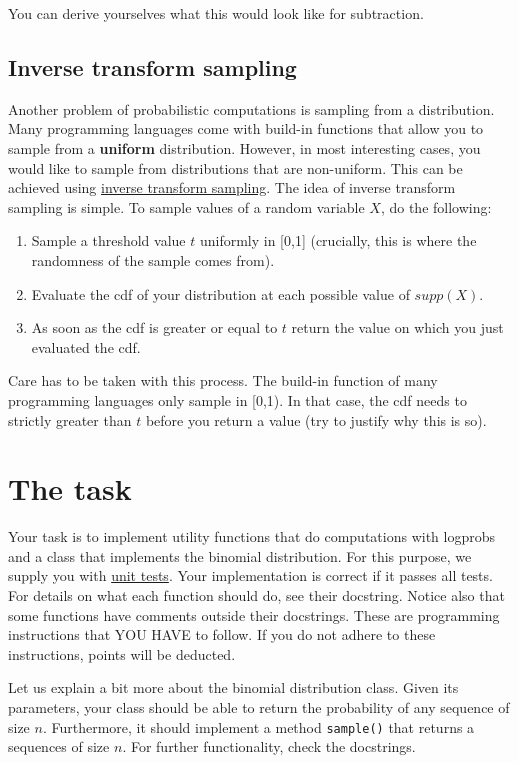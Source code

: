 \documentclass[11pt, leqno, a4paper]{article}
\begin{document}
You can derive yourselves what this would look like for subtraction.

\subsection{Inverse transform sampling}
Another problem of probabilistic computations is sampling from a distribution. Many programming languages
come with build-in functions that allow you to sample from a \textbf{uniform} distribution. However,
in most interesting cases, you would like to sample from distributions that are non-uniform. This can
be achieved using 
\href{https://en.wikipedia.org/wiki/Inverse_transform_sampling}{inverse transform sampling}. The idea of 
inverse transform sampling is simple. To sample values of a random variable $ X $, do the following:
\begin{enumerate}
\item Sample a threshold value $ t $ uniformly in [0,1] (crucially, this is where the randomness of the 
sample comes from).
\item Evaluate the cdf of your distribution at each possible value of $ supp(X) $.
\item As soon as the cdf is greater or equal to $ t $ return the value on which you just evaluated the cdf.
\end{enumerate}

Care has to be taken with this process. The build-in function of many programming languages only
sample in [0,1). In that case, the cdf needs to strictly greater than $ t $ before you return a value (try
to justify why this is so).

\section{The task}
Your task is to implement utility functions that do computations with logprobs and a class that 
implements the binomial distribution. For this purpose, we
supply you with \href{https://docs.python.org/2/library/unittest.html}{unit tests}. 
Your implementation is correct if it passes all tests. For details on
what each function should do, see their docstring. Notice also that some functions have comments
outside their docstrings. These are programming instructions that YOU HAVE to follow. If you do
not adhere to these instructions, points will be deducted.

Let us explain a bit more about the binomial distribution class. Given its parameters, your
class should be able to return the probability of any sequence of size $ n $. Furthermore,
it should implement a method \texttt{sample()} that returns a sequences of size $ n $. For further 
functionality, check the docstrings.
\end{document}
